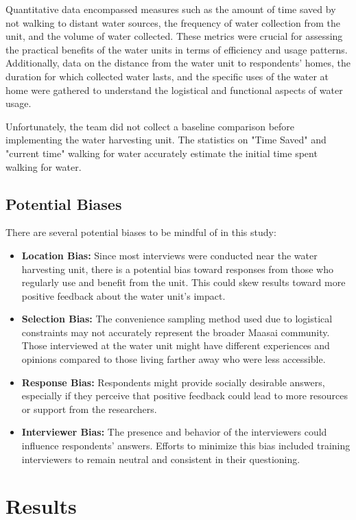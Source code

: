 \documentclass[10pt, twocolumn]{article}
\begin{document}
Quantitative data encompassed measures such as the amount of time saved by not walking to distant water sources, the frequency of water collection from the unit, and the volume of water collected. These metrics were crucial for assessing the practical benefits of the water units in terms of efficiency and usage patterns. Additionally, data on the distance from the water unit to respondents' homes, the duration for which collected water lasts, and the specific uses of the water at home were gathered to understand the logistical and functional aspects of water usage.

Unfortunately, the team did not collect a baseline comparison before implementing the water harvesting unit. The statistics on "Time Saved" and "current time" walking for water accurately estimate the initial time spent walking for water.

\subsection{Potential Biases}

There are several potential biases to be mindful of in this study:

\begin{itemize}
    \item \textbf{Location Bias:} Since most interviews were conducted near the water harvesting unit, there is a potential bias toward responses from those who regularly use and benefit from the unit. This could skew results toward more positive feedback about the water unit's impact.
    \item \textbf{Selection Bias:} The convenience sampling method used due to logistical constraints may not accurately represent the broader Maasai community. Those interviewed at the water unit might have different experiences and opinions compared to those living farther away who were less accessible.
    \item \textbf{Response Bias:} Respondents might provide socially desirable answers, especially if they perceive that positive feedback could lead to more resources or support from the researchers.
    \item \textbf{Interviewer Bias:} The presence and behavior of the interviewers could influence respondents' answers. Efforts to minimize this bias included training interviewers to remain neutral and consistent in their questioning.
\end{itemize}

\section{Results}
\end{document}
